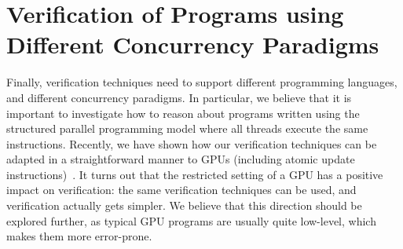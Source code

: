 \section{Verification of Programs using Different Concurrency Paradigms}\label{sec:other}
Finally, verification techniques need to support different programming languages, and different concurrency paradigms. 
In particular, we believe that it is important to investigate how to reason about programs written using the structured parallel programming model where all threads execute the same instructions. Recently, we have shown how our verification techniques can be adapted in a straightforward manner to GPUs (including atomic update instructions)~\cite{BlomHM14,BlomDH15}. 
It  turns out that the restricted setting of a GPU has a positive impact on verification: the same verification techniques can be used, and verification actually gets simpler.
We believe that this direction should be explored further, as typical GPU programs are usually quite low-level, which makes them more error-prone. %


